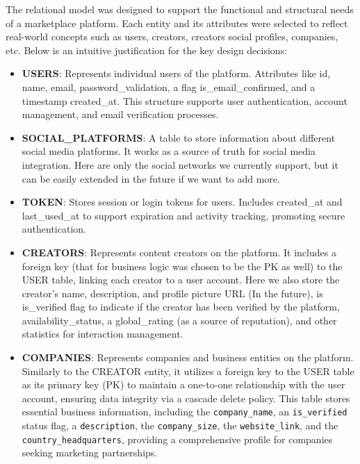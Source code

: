 The relational model was designed to support the functional and structural needs of a marketplace platform. Each entity and its attributes were selected to reflect real-world concepts such as users, creators, creators social profiles, companies, etc. Below is an intuitive justification for the key design decisions:
\begin{itemize}
    \item \textbf{USERS}: Represents individual users of the platform. Attributes like id, name, email,  password\_validation, a flag is\_email\_confirmed, and a timestamp created\_at. This structure supports user authentication, account management, and email verification processes.

    \item \textbf{SOCIAL\_PLATFORMS}: A table to store information about different social media platforms. It works as a source of truth for social media integration. Here are only the social networks we currently support, but it can be easily extended in the future if we want to add more.

    \item \textbf{TOKEN}: Stores session or login tokens for users. Includes created\_at and last\_used\_at to support expiration and activity tracking, promoting secure authentication.

    \item \textbf{CREATORS}: Represents content creators on the platform. It includes a foreign key (that for business logic was chosen to be the PK as well) to the USER table, linking each creator to a user account. Here we also store the creator's name, description, and profile picture URL (In the future), is is\_verified flag to indicate if the creator has been verified by the platform, availability\_status, a global\_rating (as a source of reputation), and other statistics for interaction management.

    \item \textbf{COMPANIES}: Represents companies and business entities on the platform. Similarly to the CREATOR entity, it utilizes a foreign key to the USER table as its primary key (PK) to maintain a one-to-one relationship with the user account, ensuring data integrity via a cascade delete policy. This table stores essential business information, including the \texttt{company\_name}, an \texttt{is\_verified} status flag, a \texttt{description}, the \texttt{company\_size}, the \texttt{website\_link}, and the \texttt{country\_headquarters}, providing a comprehensive profile for companies seeking marketing partnerships.


\end{itemize}
